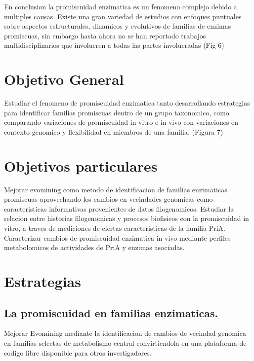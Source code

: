 \documentclass[12pt,twoside]{reedthesis}
\begin{document}
  En conclusion la promiscuidad enzimatica es un fenomeno complejo debido
  a multiples causas. Existe una gran variedad de estudios con enfoques
  puntuales sobre aspectos estructurales, dinamicos y evolutivos de
  familias de enzimas promiscuas, sin embargo hasta ahora no se han
  reportado trabajos multidisciplinarios que involucren a todas las partes
  involucradas (Fig 6)
  
  \section{Objetivo General}\label{objetivo-general}
  
  Estudiar el fenomeno de promiscuidad enzimatica tanto desarrollando
  estrategias para identificar familias promiscuas dentro de un grupo
  taxonomico, como comparando variaciones de promiscuidad in vitro e in
  vivo con variaciones en contexto genomico y flexibilidad en miembros de
  una familia. (Figura 7)
  
  \section{Objetivos particulares}\label{objetivos-particulares}
  
  Mejorar evomining como metodo de identificacion de familias enzimaticas
  promiscuas aprovechando los cambios en vecindades genomicas como
  caracteristicas informativas provenientes de datos filogenomicos.
  Estudiar la relacion entre historias filogenomicas y procesos biofisicos
  con la promiscuidad in vitro, a traves de mediciones de ciertas
  caracteristicas de la familia PriA. Caracterizar cambios de promiscuidad
  enzimatica in vivo mediante perfiles metabolomicos de actividades de
  PriA y enzimas asociadas.
  
  \section{Estrategias}\label{estrategias}
  
  \subsection{La promiscuidad en familias
  enzimaticas.}\label{la-promiscuidad-en-familias-enzimaticas.}
  
  Mejorar Evomining mediante la identificacion de cambios de vecindad
  genomica en familias selectas de metabolismo central convirtiendola en
  una plataforma de codigo libre disponible para otros investigadores.
  
\end{document}

